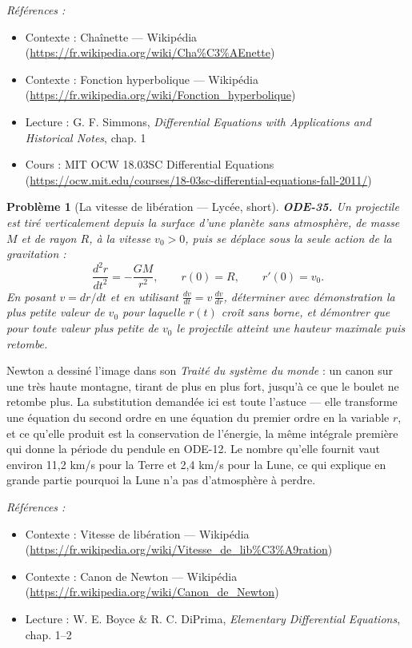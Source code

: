 \documentclass[11pt]{article}
\newtheorem{problem}{Problème}
\newenvironment{refs}{\par\small\noindent\emph{Références :}\begin{itemize}\setlength\itemsep{0pt}}{\end{itemize}\normalsize}
\begin{document}
\begin{refs}
\item Contexte : Chaînette --- Wikipédia (\url{https://fr.wikipedia.org/wiki/Cha%C3%AEnette})
\item Contexte : Fonction hyperbolique --- Wikipédia (\url{https://fr.wikipedia.org/wiki/Fonction_hyperbolique})
\item Lecture : G. F. Simmons, \textit{Differential Equations with Applications and Historical Notes}, chap. 1
\item Cours : MIT OCW 18.03SC Differential Equations (\url{https://ocw.mit.edu/courses/18-03sc-differential-equations-fall-2011/})
\end{refs}

\bigskip

\begin{problem}[{La vitesse de libération --- Lycée, short}]
\textbf{ODE-35.} Un projectile est tiré verticalement depuis la surface
d'une planète sans atmosphère, de masse $ M $ et de rayon $ R $, à la vitesse
$ v_0 > 0 $, puis se déplace sous la seule action de la gravitation :
\[ \frac{d^2 r}{dt^2} = -\frac{GM}{r^2}, \qquad r(0) = R, \qquad r'(0) = v_0 . \]
En posant $ v = dr/dt $ et en utilisant $ \frac{dv}{dt} = v\,\frac{dv}{dr} $, déterminer avec
démonstration la plus petite valeur de $ v_0 $ pour laquelle $ r(t) $ croît sans borne, et
démontrer que pour toute valeur plus petite de $ v_0 $ le projectile atteint une hauteur
maximale puis retombe.
\end{problem}

\noindent Newton a dessiné l'image dans son \textit{Traité du système du monde} : un canon
sur une très haute montagne, tirant de plus en plus fort, jusqu'à ce que le boulet ne retombe
plus. La substitution demandée ici est toute l'astuce --- elle transforme une équation du second
ordre en une équation du premier ordre en la variable $ r $, et ce qu'elle produit est la
conservation de l'énergie, la même intégrale première qui donne la période du pendule en ODE-12.
Le nombre qu'elle fournit vaut environ 11,2 km/s pour la Terre et 2,4 km/s pour la Lune, ce qui
explique en grande partie pourquoi la Lune n'a pas d'atmosphère à perdre.

\begin{refs}
\item Contexte : Vitesse de libération --- Wikipédia (\url{https://fr.wikipedia.org/wiki/Vitesse_de_lib%C3%A9ration})
\item Contexte : Canon de Newton --- Wikipédia (\url{https://fr.wikipedia.org/wiki/Canon_de_Newton})
\item Lecture : W. E. Boyce \& R. C. DiPrima, \textit{Elementary Differential Equations}, chap. 1--2
\end{refs}
\end{document}
